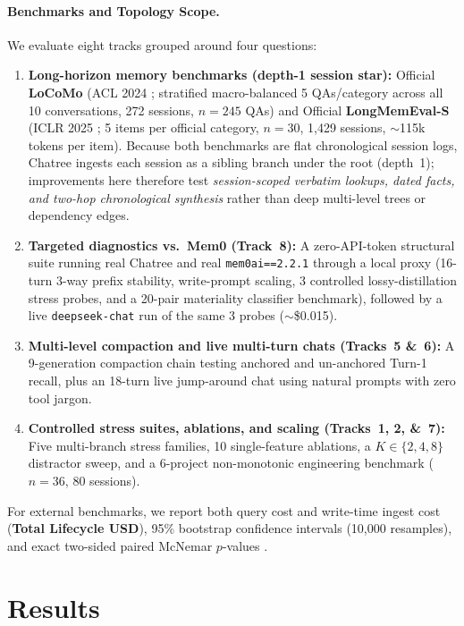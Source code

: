 \documentclass[10pt,twocolumn]{article}
\begin{document}
\paragraph{Benchmarks and Topology Scope.}
We evaluate eight tracks grouped around four questions:
\begin{enumerate}
  \item \textbf{Long-horizon memory benchmarks (depth-1 session star):} Official \textbf{LoCoMo} (ACL 2024 \citep{maharana2024locomo}; stratified macro-balanced 5 QAs/category across all 10 conversations, 272 sessions, $n=245$ QAs) and Official \textbf{LongMemEval-S} (ICLR 2025 \citep{wu2025longmemeval}; 5 items per official category, $n=30$, 1,429 sessions, $\sim$115k tokens per item). Because both benchmarks are flat chronological session logs, Chatree ingests each session as a sibling branch under the root (depth~1); improvements here therefore test \emph{session-scoped verbatim lookups, dated facts, and two-hop chronological synthesis} rather than deep multi-level trees or dependency edges.
  \item \textbf{Targeted diagnostics vs.\ Mem0 (Track~8):} A zero-API-token structural suite running real Chatree and real \texttt{mem0ai==2.2.1} through a local proxy (16-turn 3-way prefix stability, write-prompt scaling, 3 controlled lossy-distillation stress probes, and a 20-pair materiality classifier benchmark), followed by a live \texttt{deepseek-chat} run of the same 3 probes ($\sim$\$0.015).
  \item \textbf{Multi-level compaction and live multi-turn chats (Tracks~5 \&~6):} A 9-generation compaction chain testing anchored and un-anchored Turn-1 recall, plus an 18-turn live jump-around chat using natural prompts with zero tool jargon.
  \item \textbf{Controlled stress suites, ablations, and scaling (Tracks~1, 2, \&~7):} Five multi-branch stress families, 10 single-feature ablations, a $K \in \{2,4,8\}$ distractor sweep, and a 6-project non-monotonic engineering benchmark ($n=36$, 80 sessions).
\end{enumerate}
For external benchmarks, we report both query cost and write-time ingest cost (\textbf{Total Lifecycle USD}), 95\% bootstrap confidence intervals (10,000 resamples), and exact two-sided paired McNemar $p$-values \citep{mcnemar1947note}.

\section{Results}
\end{document}
